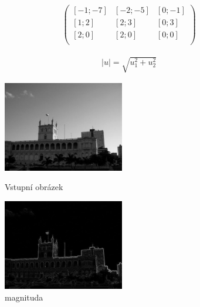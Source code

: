 \documentclass{report}
\begin{document}
\begin{align}
	\label{gradient_vektory} 
		\begin{pmatrix} 
			[-1 ; -7] & [-2 ; -5] & [0 ; -1] \\
			[1 ; 2] & [2 ; 3] & [0 ; 3] \\
			[2 ; 0] & [2 ; 0] & [0 ; 0] \\
		\end{pmatrix}
		\tag{Gradient jako 2D vektory} 			   
\end{align}

\begin{align}
   \label{velikost_vektoru} |u| = \sqrt{u_1^2 + u_2^2}
   \tag{Velikost vektoru v rovině.}
\end{align}

\begin{figure}[htp]
	\centering
	\begin{minipage}[c]{150pt}
		\centering
		\includegraphics[width=150pt]{./img/vstupni_obraz.jpg}
		\caption{Vstupní obrázek}
	\end{minipage}
	\begin{minipage}[c]{150pt}
		\includegraphics[width=150pt]{./img/magnitude.png}
		\caption{magnituda}
		\centering
	\end{minipage}
\end{figure}
\end{document}
